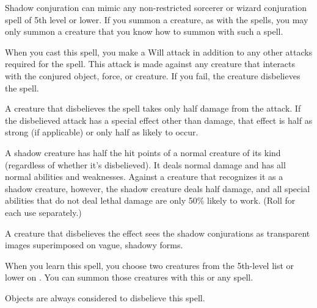 \begin{spelleffect}
  Shadow conjuration can mimic any non-restricted sorcerer or wizard conjuration spell of 5th level or lower. If you summon a creature, as with the  spells, you may only summon a creature that you know how to summon with such a spell.
  \par When you cast this spell, you make a Will attack in addition to any other attacks required for the spell. This attack is made against any creature that interacts with the conjured object, force, or creature. If you fail, the creature disbelieves the spell.
  \par A creature that disbelieves the spell takes only half damage from the attack. If the disbelieved attack has a special effect other than damage, that effect is half as strong (if applicable) or only half as likely to occur.
  \par A shadow creature has half the hit points of a normal creature of its kind (regardless of whether it's disbelieved). It deals normal damage and has all normal abilities and weaknesses. Against a creature that recognizes it as a shadow creature, however, the shadow creature deals half damage, and all special abilities that do not deal lethal damage are only 50\% likely to work. (Roll for each use separately.)
\end{spelleffect}
\begin{spellnotes}
  A creature that disbelieves the effect sees the shadow conjurations as transparent images superimposed on vague, shadowy forms.
  \par When you learn this spell, you choose two creatures from the 5th-level list or lower on . You can summon those creatures with this or any  spell.
  \par Objects are always considered to disbelieve this spell.
\end{spellnotes}

